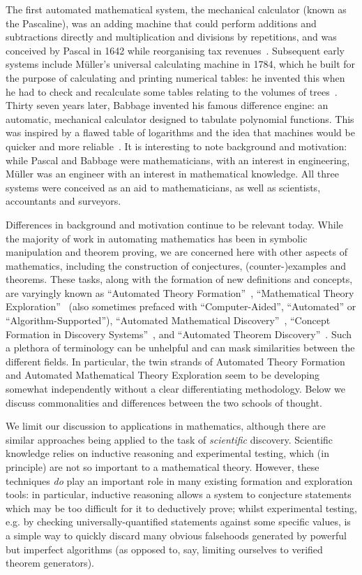 The first automated mathematical system, the mechanical calculator
(known as the Pascaline), was an adding machine that could perform
additions and subtractions directly and multiplication and divisions
by repetitions, and was conceived by Pascal in 1642 while reorganising
tax revenues~\cite{d'ocagne}. Subsequent early systems include
M\"uller's universal calculating machine in 1784, which he built for
the purpose of calculating and printing numerical tables: he invented
this when he had to check and recalculate some tables relating to the
volumes of trees~\cite[p. 65]{lindgren}. Thirty seven years later,
Babbage invented his famous difference engine: an automatic,
mechanical calculator designed to tabulate polynomial functions. This
was inspired by a flawed table of logarithms and the idea that
machines would be quicker and more reliable~\cite{bowden}. It is
interesting to note background and motivation: while Pascal and
Babbage were mathematicians, with an interest in engineering, M\"uller
was an engineer with an interest in mathematical knowledge. All three
systems were conceived as an aid to mathematicians, as well as
scientists, accountants and surveyors.

Differences in background and motivation continue to be relevant
today. While the majority of work in automating mathematics has been
in symbolic manipulation and theorem proving, we are concerned here
with other aspects of mathematics, including the construction of conjectures,
(counter\nobreakdash-)examples and theorems. These tasks, along with the
formation of new definitions and concepts, are varyingly known as
``Automated Theory Formation''~\cite{lenat:77,colton:book},
``Mathematical Theory Exploration''~\cite{buchberger:06} (also sometimes
prefaced with ``Computer-Aided'', ``Automated'' or ``Algorithm-Supported''),
``Automated Mathematical Discovery''~\cite{epstein:91,colton:interestingness,esarm2008},
``Concept Formation in Discovery Systems''~\cite{haase}, and
``Automated Theorem Discovery''~\cite{roy}. Such a plethora of terminology can
be unhelpful and can mask similarities between the different fields. In
particular, the twin strands of Automated Theory Formation and
Automated Mathematical Theory Exploration seem to be developing
somewhat independently without a clear differentiating
methodology. Below we discuss commonalities and differences between
the two schools of thought.

We limit our discussion to applications in mathematics, although there are
similar approaches being applied to the task of \emph{scientific} discovery.
Scientific knowledge relies on inductive reasoning and experimental testing,
which (in principle) are not so important to a mathematical theory. However,
these techniques \emph{do} play an important role in many existing formation and
exploration tools: in particular, inductive reasoning allows a system to
conjecture statements which may be too difficult for it to deductively prove;
whilst experimental testing, e.g. by checking universally-quantified statements
against some specific values, is a simple way to quickly discard many obvious
falsehoods generated by powerful but imperfect algorithms (as opposed to, say,
limiting ourselves to verified theorem generators).

